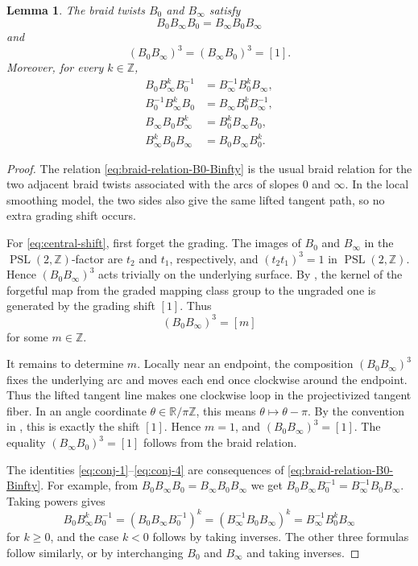 \documentclass[11pt,a4paper,reqno]{amsart}%
\theoremstyle{plain}
\newtheorem{lemma}[lemma]{Lemma}
\theoremstyle{definition}
\numberwithin{equation}{section}
\numberwithin{equation}{section}
\def\ZZ{\mathbb{Z}}
\def\PSL{\operatorname{PSL}}
\begin{document}
\begin{lemma}\label{lem:bt-word-identities}
The braid twists $B_0$ and $B_\infty$ satisfy
\begin{equation}\label{eq:braid-relation-B0-Binfty}
B_0B_\infty B_0=B_\infty B_0B_\infty
\end{equation}
and
\begin{equation}\label{eq:central-shift}
(B_0B_\infty)^3=(B_\infty B_0)^3=[1].
\end{equation}
Moreover, for every $k\in\ZZ$,
\begin{align}
B_0B_\infty^kB_0^{-1}&=B_\infty^{-1}B_0^kB_\infty,\label{eq:conj-1}\\
B_0^{-1}B_\infty^kB_0&=B_\infty B_0^kB_\infty^{-1},\label{eq:conj-2}\\
B_\infty B_0B_\infty^k&=B_0^kB_\infty B_0,\label{eq:conj-3}\\
B_\infty^kB_0B_\infty&=B_0B_\infty B_0^k.\label{eq:conj-4}
\end{align}
\end{lemma}

\begin{proof}
The relation \eqref{eq:braid-relation-B0-Binfty} is the usual braid relation for the two adjacent braid twists associated with the arcs of slopes $0$ and $\infty$. In the local smoothing model, the two sides also give the same lifted tangent path, so no extra grading shift occurs.

For \eqref{eq:central-shift}, first forget the grading. The images of $B_0$ and
$B_\infty$ in the $\PSL(2,\ZZ)$-factor are $t_2$ and $t_1$, respectively, and
$(t_2t_1)^3=1$ in $\PSL(2,\ZZ)$. Hence $(B_0B_\infty)^3$ acts trivially on the
underlying surface. By , the kernel of the forgetful map from the
graded mapping class group to the ungraded one is generated by the grading shift
$[1]$. Thus
\[
(B_0B_\infty)^3=[m]
\]
for some $m\in\ZZ$.

It remains to determine $m$. Locally near an endpoint, the composition $(B_0B_\infty)^3$ fixes the underlying arc and moves each end once clockwise around the endpoint. Thus the lifted tangent line makes one clockwise loop in the projectivized tangent fiber. In an angle coordinate $\theta\in\mathbb{R}/\pi\mathbb{Z}$, this means $\theta\mapsto\theta-\pi$. By the convention in , this is exactly the shift $[1]$. Hence $m=1$, and $(B_0B_\infty)^3=[1]$. The equality $(B_\infty B_0)^3=[1]$ follows from the braid relation.

The identities \eqref{eq:conj-1}--\eqref{eq:conj-4} are consequences of
\eqref{eq:braid-relation-B0-Binfty}. For example, from
$B_0B_\infty B_0=B_\infty B_0B_\infty$ we get
$B_0B_\infty B_0^{-1}=B_\infty^{-1}B_0B_\infty$. Taking powers gives
\[
B_0B_\infty^kB_0^{-1}
=(B_0B_\infty B_0^{-1})^k
=(B_\infty^{-1}B_0B_\infty)^k
=B_\infty^{-1}B_0^kB_\infty
\]
for $k\ge 0$, and the case $k<0$ follows by taking inverses. The other three
formulas follow similarly, or by interchanging $B_0$ and $B_\infty$ and taking
inverses.
\end{proof}
\end{document}
